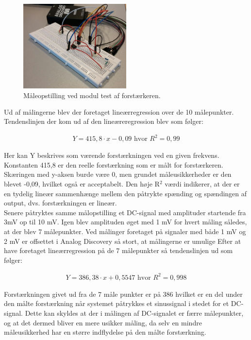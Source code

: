 \begin{figure}[H]
	\centering
	\includegraphics[width=0.5\textwidth]{Figurer/Hardware/ForstaerkerTest}
	\caption{Måleopstilling ved modul test af forstærkeren.}
	\label{fig:ForstaerkerTest}
\end{figure}

Ud af målingerne blev der foretaget lineærregression over de 10 målepunkter. Tendenslinjen der kom ud af den lineæreregression blev som følger:

\begin{center}
\begin{align}
 Y = 415,8\cdot x-0,09 \text{     hvor }R^{2} = 0,99
\end{align}
\end{center}

Her kan Y beskrives som værende forstærkningen ved en given frekvens. Konstanten 415,8 er den reelle forstærkning som er målt for forstærkeren. Skæringen med y-aksen burde være 0, men grundet måleusikkerheder er den blevet -0,09, hvilket også er acceptabelt. Den høje R$^2$ værdi indikerer, at der er en tydelig lineær sammenhænge mellem den påtrykte spænding og spændingen af output, dvs. forstærkningen er lineær.\\
Senere påtryktes samme målopstilling et DC-signal med amplituder startende fra 3mV op til 10 mV. Igen blev amplituden øget med 1 mV for hvert måling således, at der blev 7 målepunkter. Ved målinger foretaget på signaler med både 1 mV og 2 mV er offsettet i Analog Discovery så stort, at målingerne er umulige
Efter at have foretaget lineærregression på de 7 målepunkter så tendenslinjen ud som følger:

\begin{center}
\begin{align}
Y = 386,38\cdot x+0,5547\text{     hvor }R^{2} = 0,998
\end{align}
\end{center}

Forstærkningen givet ud fra de 7 måle punkter er på 386 hvilket er en del under den målte forstærkning når systemet påtrykkes et sinussignal i stedet for et DC-signal. Dette kan skyldes at der i målingen af DC-signalet er færre målepunkter, og at det dermed bliver en mere usikker måling, da selv en mindre måleusikkerhed har en større indflydelse på den målte forstærkning.

